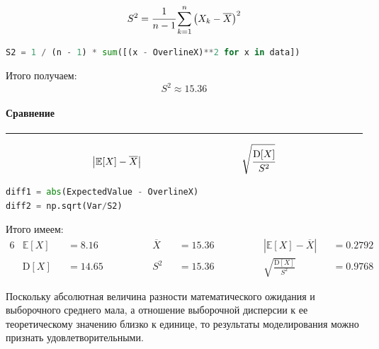 \documentclass[a4paper, 14pt]{extarticle}
\begin{document}
\begin{equation*}
  S^2 = \cfrac{1}{n-1} \sum_{k=1}^{n} \left( X_k - \overline{X} \right)^2
\end{equation*}

\begin{center}
  \begin{lstlisting}[language=Python]
S2 = 1 / (n - 1) * sum([(x - OverlineX)**2 for x in data])
  \end{lstlisting}
\end{center}
\vspace{10pt}
Итого получаем:
\begin{equation*}
  S^2 \approx 15.36
\end{equation*}

\paragraph{Сравнение}\vspace{-20pt}\rule{\linewidth}{0.1mm}

\begin{equation*}
  \left| \mathbb{E}[X] - \overline{X} \right| \hspace{100pt}
  \sqrt{\cfrac{\text{D}[X]}{S^2}}
\end{equation*}

\begin{center}
  \begin{lstlisting}[language=Python]
diff1 = abs(ExpectedValue - OverlineX)
diff2 = np.sqrt(Var/S2)
  \end{lstlisting}
\end{center}
\vspace{10pt}

Итого имеем:
\begin{alignat*}{6}
  & \mathbb{E}[X] &&= 8.16 &\hspace{50pt} \overline{X} &&= 15.36 &\hspace{50pt} \left| \mathbb{E}[X] - \overline{X} \right| &&= 0.2792 \\
  & \text{D}[X] &&= 14.65 &\hspace{50pt} S^2 &&= 15.36 &\hspace{50pt} \sqrt{\frac{\text{D}[X]}{S^2}} &&= 0.9768
\end{alignat*}

Поскольку абсолютная величина разности математического ожидания 
и выборочного среднего мала, а отношение выборочной 
дисперсии к ее теоретическому значению близко к единице, то 
результаты моделирования можно признать удовлетворительными.
\end{document}
